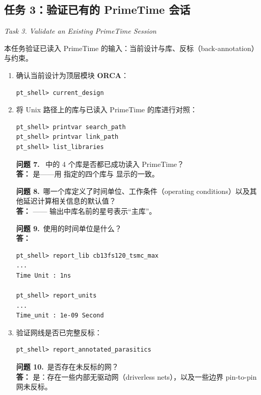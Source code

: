 \subsection{任务 3：验证已有的 PrimeTime 会话}
\label{lab1:task3}

\noindent\textit{Task 3. Validate an Existing PrimeTime Session}

本任务验证已读入 PrimeTime 的输入：当前设计与库、反标（back-annotation）与约束。

\begin{enumerate}
  \item 确认当前设计为顶层模块 \textbf{ORCA}：
\begin{lstlisting}
pt_shell> current_design
\end{lstlisting}

  \item 将 Unix 路径上的库与已读入 PrimeTime 的库进行对照：
\begin{lstlisting}
pt_shell> printvar search_path
pt_shell> printvar link_path
pt_shell> list_libraries
\end{lstlisting}

\begin{questionBox}
\textbf{问题 7.}\  中的 4 个库是否都已成功读入 PrimeTime？\\[0.35em]
\textbf{答：} 是——用  指定的四个库与  显示的一致。

\textbf{问题 8.}\ 哪一个库定义了时间单位、工作条件（operating conditions）以及其他延迟计算相关信息的默认值？\\[0.35em]
\textbf{答：} —— 输出中库名前的星号表示“主库”。

\textbf{问题 9.}\ 使用的时间单位是什么？\\[0.35em]
\textbf{答：}\\
\begin{lstlisting}
pt_shell> report_lib cb13fs120_tsmc_max
...
Time Unit : 1ns

pt_shell> report_units
...
Time_unit : 1e-09 Second
\end{lstlisting}
\end{questionBox}

  \item 验证网线是否已完整反标：
\begin{lstlisting}
pt_shell> report_annotated_parasitics
\end{lstlisting}

\begin{questionBox}
\textbf{问题 10.}\ 是否存在未反标的网？\\[0.35em]
\textbf{答：} 是：存在一些内部无驱动网（driverless nets），以及一些边界 pin-to-pin 网未反标。


\end{questionBox}
\end{enumerate}
